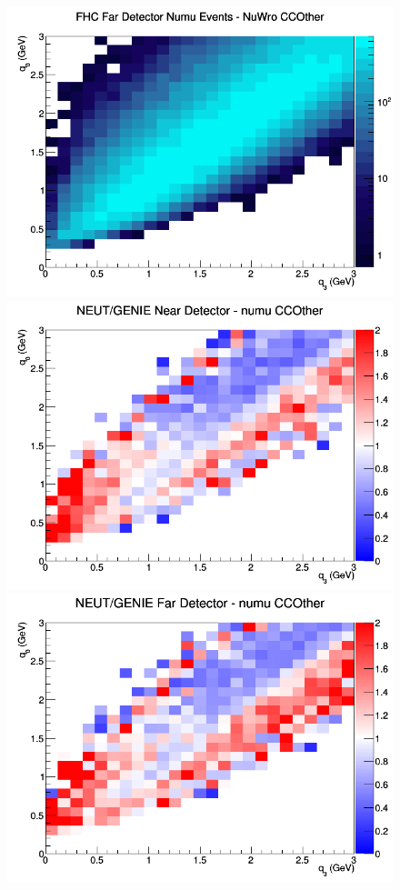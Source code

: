 \documentclass[12pt]{article}
\begin{document}
\begin{figure}[h]
\endminipage
{}
\includegraphics[width=\linewidth]{eff_q0_q3/GAr/CCOther_FHC_FD_numu_q3_q0_NuWro.png}
\endminipage
\newline
{}
\includegraphics[width=\linewidth]{eff_q0_q3/GAr/ratios/CCOther_NEUT_GENIE_numu_near_q3_q0.png}
\endminipage
{}
\includegraphics[width=\linewidth]{eff_q0_q3/GAr/ratios/CCOther_NEUT_GENIE_numu_far_q3_q0.png}

\end{figure}
\end{document}
